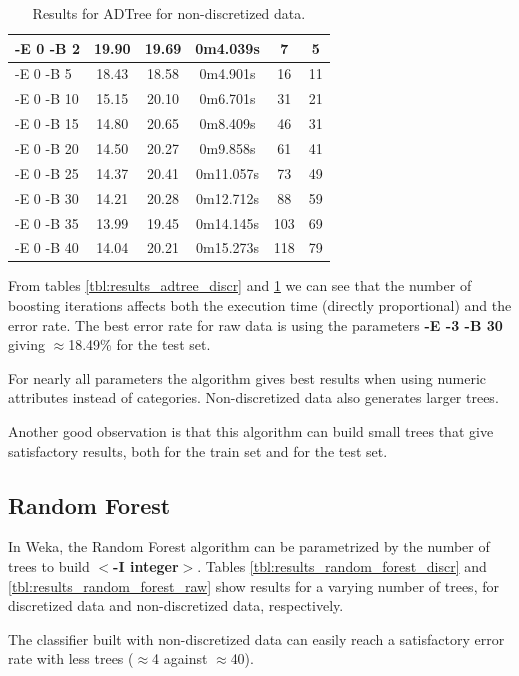 \documentclass[a4paper]{llncs}
\begin{document}
\begin{table}[ht]
\begin{center}
\begin{tabular}{ | l | c | c | c | c | c |}
    -E 0 -B 2 & 19.90 & 19.69 & 0m4.039s & 7 & 5 \\ \hline
    -E 0 -B 5 & 18.43 & 18.58 & 0m4.901s & 16 & 11 \\ \hline
    -E 0 -B 10 & 15.15 & 20.10 & 0m6.701s & 31 & 21 \\ \hline
    -E 0 -B 15 & 14.80 & 20.65 & 0m8.409s & 46 & 31 \\ \hline
    -E 0 -B 20 & 14.50 & 20.27 & 0m9.858s & 61 & 41 \\ \hline
    -E 0 -B 25 & 14.37 & 20.41 & 0m11.057s & 73 & 49 \\ \hline
    -E 0 -B 30 & 14.21 & 20.28 & 0m12.712s & 88 & 59 \\ \hline
    -E 0 -B 35 & 13.99 & 19.45 & 0m14.145s & 103 & 69 \\ \hline
    -E 0 -B 40 & 14.04 & 20.21 & 0m15.273s & 118 & 79 \\ \hline
    
  \end{tabular}
  \caption{Results for ADTree for non-discretized data.}
  \label{tbl:results_adtree_raw}
  \end{center}
\end{table}

From tables \ref{tbl:results_adtree_discr} and \ref{tbl:results_adtree_raw}
we can see that the number of boosting iterations affects
both the execution time (directly proportional) and the error rate.
The best error rate for raw data is using the parameters \textbf{-E -3 -B 30} giving $\approx$18.49\% for the test set.

For nearly all parameters the algorithm gives best results when using numeric attributes instead
of categories. Non-discretized data also generates larger trees.

Another good observation is that this algorithm can build small trees that give
satisfactory results, both for the train set and for the test set.

\subsection{Random Forest}

In Weka, the Random Forest algorithm can be parametrized by the number
of trees to build \textbf{$<$-I integer$>$}. Tables \ref{tbl:results_random_forest_discr}
and \ref{tbl:results_random_forest_raw} show results for
a varying number of trees, for discretized data and non-discretized data, respectively.

The classifier built with non-discretized data can easily reach a satisfactory
error rate with less trees ($\approx$4 against $\approx$40).
\end{document}
